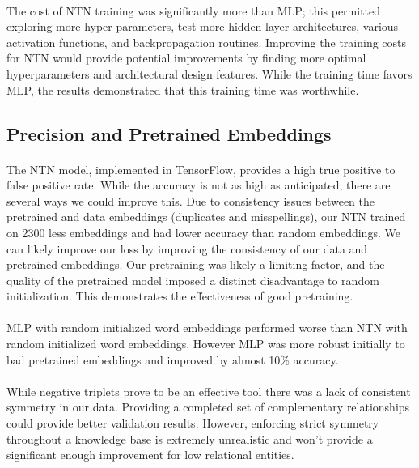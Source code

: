 \documentclass[11.5pt]{article}
\begin{document}
\paragraph{}The cost of NTN training was significantly more than MLP; this permitted exploring more hyper parameters, test more hidden layer architectures, various activation functions, and backpropagation routines. Improving the training costs for NTN would provide potential improvements by finding more optimal hyperparameters and architectural design features. While the training time favors MLP, the results demonstrated that this training time was worthwhile.

\subsection{Precision and Pretrained Embeddings}
\paragraph{} The NTN model, implemented in  TensorFlow, provides a high true positive to false positive rate. While the accuracy is not as high as anticipated, there are several ways we could improve this. Due to consistency issues between the pretrained and data embeddings (duplicates and misspellings), our NTN trained on 2300 less embeddings and had lower accuracy than random embeddings. We can likely improve our loss by improving the consistency of our data and pretrained embeddings. Our pretraining was likely a limiting factor, and the quality of the pretrained model imposed a distinct disadvantage to random initialization. This demonstrates the effectiveness of good pretraining.

\paragraph{} MLP with random initialized word embeddings performed worse than NTN with random initialized word embeddings. However MLP was more robust initially to bad pretrained embeddings and improved by almost 10\% accuracy. 

\paragraph{} While negative triplets prove to be an effective tool there was a lack of consistent symmetry in our data. Providing a completed set of complementary relationships could provide better validation results. However, enforcing strict symmetry throughout a knowledge base is extremely unrealistic and won't provide a significant enough improvement for low relational entities.
\end{document}
